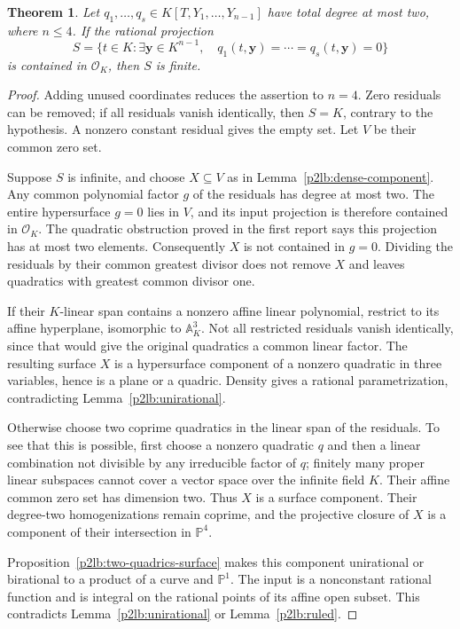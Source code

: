 \documentclass[11pt]{article}
\newtheorem{theorem}{Theorem}[section]
\theoremstyle{definition}
\begin{document}
\begin{theorem}\label{p2lb:quadratic-system-four}
Let $q_1,\ldots,q_s\in K[T,Y_1,\ldots,Y_{n-1}]$ have total
degree at most two, where $n\leq4$.  If the rational projection
\[
 S=\{t\in K:\exists\mathbf y\in K^{n-1},\quad
                   q_1(t,\mathbf y)=\cdots=q_s(t,\mathbf y)=0\}
\]
is contained in $\mathcal O_K$, then $S$ is finite.
\end{theorem}
\begin{proof}
Adding unused coordinates reduces the assertion to $n=4$.
Zero residuals can be removed; if all residuals vanish identically,
then $S=K$, contrary to the hypothesis.  A nonzero constant residual
gives the empty set.  Let $V$ be their common zero set.

Suppose $S$ is infinite, and choose $X\subseteq V$ as in
Lemma~\ref{p2lb:dense-component}.  Any common polynomial factor
$g$ of the residuals has degree at most two.  The entire hypersurface
$g=0$ lies in $V$, and its input projection is therefore contained
in $\mathcal O_K$.  The quadratic obstruction proved in the first
report says this projection has at most two elements.  Consequently
$X$ is not contained in $g=0$.  Dividing the residuals by their common
greatest divisor does not remove $X$ and leaves quadratics with
greatest common divisor one.

If their $K$-linear span contains a nonzero affine linear polynomial,
restrict to its affine hyperplane, isomorphic to $\mathbb A^3_K$.
Not all restricted residuals vanish identically, since that would
give the original quadratics a common linear factor.  The resulting
surface $X$ is a hypersurface component of a nonzero quadratic in
three variables, hence is a plane or a quadric.  Density gives a
rational parametrization, contradicting Lemma~\ref{p2lb:unirational}.

Otherwise choose two coprime quadratics in the linear span of the
residuals.  To see that this is possible, first choose a nonzero
quadratic $q$ and then a linear combination not divisible by any
irreducible factor of $q$; finitely many proper linear subspaces
cannot cover a vector space over the infinite field $K$.
Their affine common zero set has dimension two.  Thus $X$ is a
surface component.  Their degree-two homogenizations remain coprime,
and the projective closure of $X$ is a component of their intersection
in $\mathbb P^4$.

Proposition~\ref{p2lb:two-quadrics-surface} makes this component
unirational or birational to a product of a curve and $\mathbb P^1$.
The input is a nonconstant rational function and is integral on
the rational points of its affine open subset.  This contradicts
Lemma~\ref{p2lb:unirational} or Lemma~\ref{p2lb:ruled}.
\end{proof}
\end{document}
